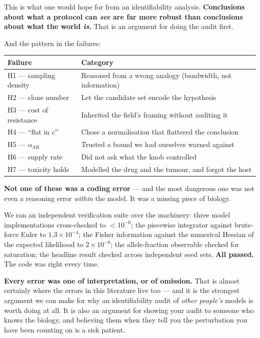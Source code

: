 \documentclass[11pt,a4paper]{article}
\newcommand{\aSR}{\alpha_{SR}}
\begin{document}
This is what one would hope for from an identifiability analysis. \textbf{Conclusions
about what a protocol can \emph{see} are far more robust than conclusions about what the
world \emph{is}.} That is an argument for doing the audit first.

And the pattern in the failures:

\begin{center}
\small
\begin{tabular}{ll}
\toprule
\textbf{Failure} & \textbf{Category}\\
\midrule
H1 --- sampling density & Reasoned from a wrong analogy (bandwidth, not information)\\
H2 --- clone number & Let the candidate set encode the hypothesis\\
H3 --- cost of resistance & Inherited the field's framing without auditing it\\
H4 --- ``flat in $c$'' & Chose a normalisation that flattered the conclusion\\
H5 --- $\aSR$ & Trusted a bound we had ourselves warned against\\
H6 --- supply rate & Did not ask what the knob controlled\\
H7 --- toxicity holds & Modelled the drug and the tumour, and forgot the host\\
\bottomrule
\end{tabular}
\end{center}

\textbf{Not one of these was a coding error} --- and the most dangerous one was not
even a reasoning error \emph{within} the model. It was a missing piece of biology.

We ran an independent verification suite over the machinery: three model implementations
cross-checked to $<10^{-6}$; the piecewise integrator against brute-force Euler to
$1.3\times10^{-4}$; the Fisher information against the numerical Hessian of the expected
likelihood to $2\times10^{-8}$; the allele-fraction observable checked for saturation;
the headline result checked across independent seed sets. \textbf{All passed.} The code
was right every time.

\begin{tcolorbox}[keybox]
\textbf{Every error was one of interpretation, or of omission.} That is almost certainly
where the errors in this literature live too --- and it is the strongest argument we can
make for why an identifiability audit of \emph{other people's} models is worth doing at
all. It is also an argument for showing your audit to someone who knows the biology, and
believing them when they tell you the perturbation you have been counting on is a sick
patient.
\end{tcolorbox}
\end{document}
